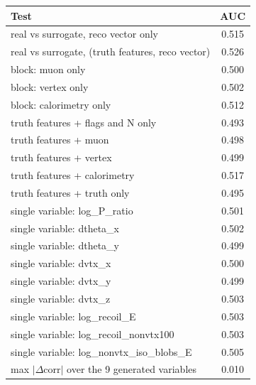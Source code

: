 \begin{tabular}{lc}
\toprule
Test & AUC \\
\midrule
real vs surrogate, reco vector only & 0.515 \\
real vs surrogate, (truth features, reco vector) & 0.526 \\
\midrule
block: muon only & 0.500 \\
block: vertex only & 0.502 \\
block: calorimetry only & 0.512 \\
truth features + flags and N only & 0.493 \\
truth features + muon & 0.498 \\
truth features + vertex & 0.499 \\
truth features + calorimetry & 0.517 \\
truth features + truth only & 0.495 \\
single variable: log\_P\_ratio & 0.501 \\
single variable: dtheta\_x & 0.502 \\
single variable: dtheta\_y & 0.499 \\
single variable: dvtx\_x & 0.500 \\
single variable: dvtx\_y & 0.499 \\
single variable: dvtx\_z & 0.503 \\
single variable: log\_recoil\_E & 0.503 \\
single variable: log\_recoil\_nonvtx100 & 0.503 \\
single variable: log\_nonvtx\_iso\_blobs\_E & 0.505 \\
\midrule
max $|\Delta$corr$|$ over the 9 generated variables & 0.010 \\
\bottomrule
\end{tabular}
